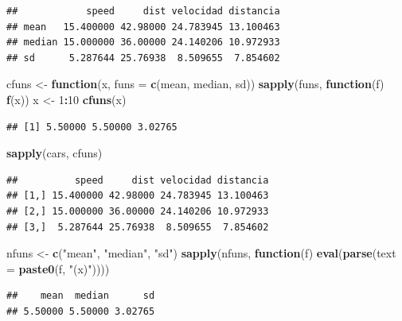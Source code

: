 \documentclass[
]{book}
\newenvironment{Shaded}{\begin{snugshade}}{\end{snugshade}}
\newcommand{\AttributeTok}[1]{\textcolor[rgb]{0.13,0.29,0.53}{#1}}
\newcommand{\ControlFlowTok}[1]{\textcolor[rgb]{0.13,0.29,0.53}{\textbf{#1}}}
\newcommand{\DecValTok}[1]{\textcolor[rgb]{0.00,0.00,0.81}{#1}}
\newcommand{\FunctionTok}[1]{\textcolor[rgb]{0.13,0.29,0.53}{\textbf{#1}}}
\newcommand{\NormalTok}[1]{#1}
\newcommand{\OtherTok}[1]{\textcolor[rgb]{0.56,0.35,0.01}{#1}}
\newcommand{\SpecialCharTok}[1]{\textcolor[rgb]{0.81,0.36,0.00}{\textbf{#1}}}
\newcommand{\StringTok}[1]{\textcolor[rgb]{0.31,0.60,0.02}{#1}}
\begin{document}
\begin{verbatim}
##            speed     dist velocidad distancia
## mean   15.400000 42.98000 24.783945 13.100463
## median 15.000000 36.00000 24.140206 10.972933
## sd      5.287644 25.76938  8.509655  7.854602
\end{verbatim}

\begin{Shaded}
\begin{Highlighting}[]
\NormalTok{cfuns }\OtherTok{\textless{}{-}} \ControlFlowTok{function}\NormalTok{(x, }\AttributeTok{funs =} \FunctionTok{c}\NormalTok{(mean, median, sd))}
            \FunctionTok{sapply}\NormalTok{(funs, }\ControlFlowTok{function}\NormalTok{(f) }\FunctionTok{f}\NormalTok{(x))}
\NormalTok{x }\OtherTok{\textless{}{-}} \DecValTok{1}\SpecialCharTok{:}\DecValTok{10}
\FunctionTok{cfuns}\NormalTok{(x)}
\end{Highlighting}
\end{Shaded}

\begin{verbatim}
## [1] 5.50000 5.50000 3.02765
\end{verbatim}

\begin{Shaded}
\begin{Highlighting}[]
\FunctionTok{sapply}\NormalTok{(cars, cfuns)}
\end{Highlighting}
\end{Shaded}

\begin{verbatim}
##          speed     dist velocidad distancia
## [1,] 15.400000 42.98000 24.783945 13.100463
## [2,] 15.000000 36.00000 24.140206 10.972933
## [3,]  5.287644 25.76938  8.509655  7.854602
\end{verbatim}

\begin{Shaded}
\begin{Highlighting}[]
\NormalTok{nfuns }\OtherTok{\textless{}{-}} \FunctionTok{c}\NormalTok{(}\StringTok{"mean"}\NormalTok{, }\StringTok{"median"}\NormalTok{, }\StringTok{"sd"}\NormalTok{)}
\FunctionTok{sapply}\NormalTok{(nfuns, }
       \ControlFlowTok{function}\NormalTok{(f) }\FunctionTok{eval}\NormalTok{(}\FunctionTok{parse}\NormalTok{(}\AttributeTok{text =} \FunctionTok{paste0}\NormalTok{(f, }\StringTok{"(x)"}\NormalTok{))))}
\end{Highlighting}
\end{Shaded}

\begin{verbatim}
##    mean  median      sd 
## 5.50000 5.50000 3.02765
\end{verbatim}
\end{document}
